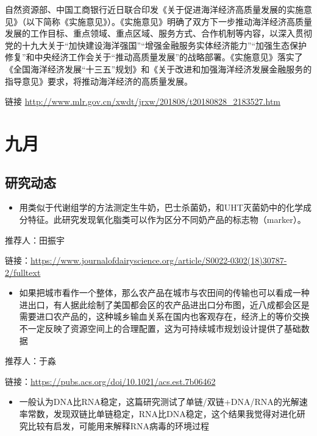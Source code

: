 \documentclass[]{book}
\providecommand{\tightlist}{%
  \setlength{\itemsep}{0pt}\setlength{\parskip}{0pt}}
\begin{document}
自然资源部、中国工商银行近日联合印发《关于促进海洋经济高质量发展的实施意见》（以下简称《实施意见》）。《实施意见》明确了双方下一步推动海洋经济高质量发展的工作目标、重点领域、重点区域、服务方式、合作机制等内容，以深入贯彻党的十九大关于``加快建设海洋强国''``增强金融服务实体经济能力''``加强生态保护修复''和中央经济工作会关于``推动高质量发展''的战略部署。《实施意见》落实了《全国海洋经济发展``十三五''规划》和《关于改进和加强海洋经济发展金融服务的指导意见》要求，将推动海洋经济的高质量发展。

链接 \url{http://www.mlr.gov.cn/xwdt/jrxw/201808/t20180828_2183527.htm}

\section*{九月}

\subsection*{研究动态}\label{-10}

\begin{itemize}
\tightlist
\item
  用类似于代谢组学的方法测定生牛奶，巴士杀菌奶，和UHT灭菌奶中的化学成分特征。此研究发现氧化脂类可以作为区分不同奶产品的标志物（marker）。
\end{itemize}

推荐人：田振宇

链接：\url{https://www.journalofdairyscience.org/article/S0022-0302(18)30787-2/fulltext}

\begin{itemize}
\tightlist
\item
  如果把城市看作一个整体，那么农产品在城市与农田间的传输也可以看成一种进出口，有人据此绘制了美国都会区的农产品进出口分布图，近八成都会区是需要进口农产品的，这种城乡输血关系在国内也客观存在，经济上的等价交换不一定反映了资源空间上的合理配置，这为可持续城市规划设计提供了基础数据
\end{itemize}

推荐人：于淼

链接：\url{https://pubs.acs.org/doi/10.1021/acs.est.7b06462}

\begin{itemize}
\tightlist
\item
  一般认为DNA比RNA稳定，这篇研究测试了单链/双链+DNA/RNA的光解速率常数，发现双链比单链稳定，RNA比DNA稳定，这个结果我觉得对进化研究比较有启发，可能用来解释RNA病毒的环境过程
\end{itemize}
\end{document}
